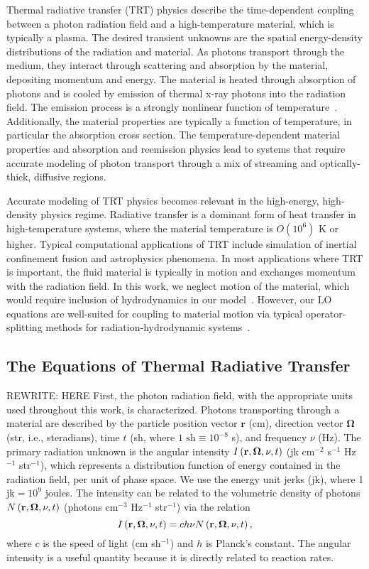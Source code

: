 Thermal radiative transfer (TRT) physics describe the time-dependent coupling between a photon
radiation field and a high-temperature material, which is typically a plasma.  The desired
transient unknowns are the spatial
energy-density distributions of the radiation and material.  As photons transport through
the medium, they interact through scattering and absorption by the material, depositing
momentum and energy.  The
material is heated through absorption of photons and is cooled by emission of thermal
x-ray photons
into the radiation field.  The emission process is a strongly nonlinear
function of temperature~\cite{mihalas}.  Additionally, the  material properties are
typically a function of temperature, in particular the absorption cross section.  The
temperature-dependent material properties and
absorption and reemission physics lead to systems that require accurate modeling of
photon transport through a mix of
streaming and optically-thick, diffusive regions. 

Accurate modeling of TRT physics becomes relevant in the high-energy,
high-density physics regime.   Radiative transfer is a dominant form of heat transfer in
high-temperature systems, where the material temperature is $O(10^6)$ K or
higher. Typical computational applications of TRT include simulation of inertial confinement fusion and
astrophysics phenomena.  In most applications where TRT is important, the fluid
material is typically in motion and exchanges momentum with the radiation field. In this work, we neglect
motion of the material, which would require inclusion of hydrodynamics in our
model~\cite{mihalas}.  However, our LO equations are well-suited for
coupling to material motion via typical operator-splitting methods for
radiation-hydrodynamic systems~\cite{radhydro_code,os_rh}.

\subsection{The Equations of Thermal Radiative Transfer}

REWRITE: HERE
First, the photon radiation field, with the appropriate units used throughout this work, is
characterized.  Photons transporting through a material are described by the particle position vector
$\mathbf{r}$ (cm), direction vector $\mathbf\Omega$ (str, i.e., steradians),
time $t$ (sh, where $1\text{ sh}\equiv10^{-8}$ s), and frequency $\nu$ (Hz).  The primary
radiation unknown is the angular intensity $I \left(\mathbf{r},\mathbf{\Omega},\nu,t\right)$ (jk cm$^{-2}$ s$^{-1}$
Hz$^{-1}$ str$^{-1}$), which represents a distribution
function of energy
contained in the radiation field, per unit of
phase space.  We use the energy unit jerks (jk), where 1 $\text{jk}= 10^9$ joules. The intensity can be related to the volumetric density of photons
$N \left(\mathbf{r},\mathbf{\Omega},\nu,t\right)$ (photons cm$^{-3}$ Hz$^{-1}$ str$^{-1}$) via the relation
\begin{equation}\label{eq:intens_dens}
    I\left(\mathbf{r},\mathbf{\Omega},\nu,t\right) = c h \nu N \left(\mathbf{r},\mathbf{\Omega},\nu,t\right),
\end{equation}
where $c$ is the speed of light (cm sh$^{-1}$) and $h$ is Planck's constant. The
angular intensity is a useful quantity because it is directly related to reaction rates.

